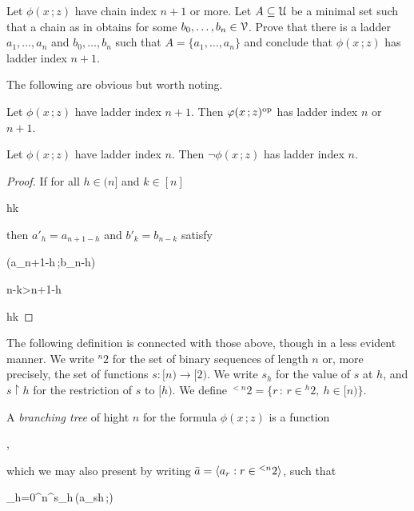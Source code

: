 \documentclass[scombinatorics.tex]{subfiles}
\begin{document}
\begin{exercise}
  Let $\phi(x\,;z)$ have chain index $n+1$ or more. 
  Let $A\subseteq\U$ be a minimal set such that a chain as in  obtains for some $b_0,\dots,b_n\in\V$.
  Prove that there is a ladder $a_1,\dots,a_n$ and $b_0,\dots,b_n$ such that $A=\{a_1,\dots,a_n\}$ and conclude that $\phi(x\,;z)$ has ladder index $n+1$.\QED
\end{exercise}

The following are obvious but worth noting.

\begin{fact}\label{fact_stability_dual}
  Let $\phi(x\,;z)$ have ladder index $n+1$. 
  Then $\phi(x\,;z)^{\rm op}$ has ladder index $n$ or $n+1$.\QED
\end{fact}
 
\begin{fact}\label{fact_stability_neg}
  Let $\phi(x\,;z)$ have ladder index $n$. 
  Then $\neg\phi(x\,;z)$ has ladder index $n$.\QED
\end{fact}

\begin{proof}
  If for all $h\in(n]$ and $k\in[n]$ 

  {\IFF}
  {h\le k}

  then $a'_h=a_{n+1-h}$ and $b'_k=b_{n-k}$ satisfy

  {\IFF}
  {\phi(a_{n+1-h}\,;b_{n-h})}

  \ceq{}
  {\IFF}
  {n-k>n+1-h}

  \ceq{}
  {\IFF}
  {h\le k}
\end{proof}
 
The following definition is connected with those above, though in a less evident manner.
We write ${}^n2$ for the set of binary sequences of length $n$ or, more precisely, the set of functions $s:[n)\to[2)$.
We write $s_h$ for the value of $s$ at $h$, and $s{\restriction} h$ for the restriction of $s$ to $[h)$.
We define ${}^{<n}2=\big\{r\, :\, r\in {}^h2,\ h\in[n)\big\}$.

A \emph{branching tree\/} of hight $n$ for the formula $\phi(x\,;z)$ is a function 

\nopagebreak[4]\par
{},

which we may also present by writing $\bar a=\<a_r:r\in{}^{<n}2\>$, such that

{\neq}
{\bigcap_{h=0}^n\neg^{s_h}\,\phi(a_{s\restriction h}\,;\V)}
\end{document}
